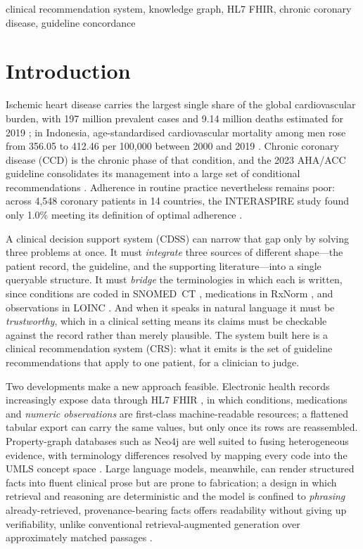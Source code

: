 \documentclass[conference]{IEEEtran}
\begin{document}
\begin{IEEEkeywords}
clinical recommendation system, knowledge graph, HL7 FHIR, chronic coronary disease,
guideline concordance
\end{IEEEkeywords}

\section{Introduction}

Ischemic heart disease carries the largest single share of the global cardiovascular
burden, with 197 million prevalent cases and 9.14 million deaths estimated for 2019
\cite{gbd2019_cvd}; in Indonesia, age-standardised cardiovascular mortality among men rose
from 356.05 to 412.46 per 100,000 between 2000 and 2019 \cite{gbd_indonesia_cvd}. Chronic
coronary disease (CCD) is the chronic phase of that condition, and the 2023 AHA/ACC
guideline consolidates its management into a large set of conditional recommendations
\cite{virani2023}. Adherence in routine practice nevertheless remains poor: across 4,548
coronary patients in 14 countries, the INTERASPIRE study found only 1.0\% meeting its
definition of optimal adherence \cite{adherence_gap}.

A clinical decision support system (CDSS) can narrow that gap only by solving three
problems at once. It must \emph{integrate} three sources of different shape---the patient
record, the guideline, and the supporting literature---into a single queryable structure.
It must \emph{bridge} the terminologies in which each is written, since conditions are
coded in SNOMED~CT \cite{snomedct}, medications in RxNorm \cite{rxnorm}, and observations
in LOINC \cite{loinc}. And when it speaks in natural language it must be
\emph{trustworthy}, which in a clinical setting means its claims must be checkable against
the record rather than merely plausible. The system built here is a clinical
recommendation system (CRS): what it emits is the set of guideline recommendations
that apply to one patient, for a clinician to judge.

Two developments make a new approach feasible. Electronic health records increasingly
expose data through HL7 FHIR \cite{fhir_r4}, in which conditions, medications and
\emph{numeric observations} are first-class machine-readable resources; a flattened tabular
export can carry the same values, but only once its rows are reassembled. Property-graph databases such as Neo4j \cite{neo4j} are well suited to
fusing heterogeneous evidence, with terminology differences resolved by mapping every code
into the UMLS concept space \cite{umls}. Large language models, meanwhile, can render
structured facts into fluent clinical prose but are prone to fabrication; a design in
which retrieval and reasoning are deterministic and the model is confined to
\emph{phrasing} already-retrieved, provenance-bearing facts offers readability without
giving up verifiability, unlike conventional retrieval-augmented generation over
approximately matched passages \cite{rag_lewis2020}.
\end{document}
